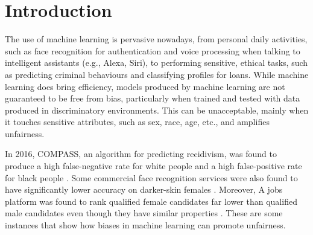 \documentclass[sigconf]{acmart}
\begin{document}
	
	
	\maketitle
	
	\section{Introduction}
	\label{sec:introduction}
	The use of machine learning is pervasive nowadays, from personal daily activities, such as face recognition for authentication and voice processing when talking to intelligent assistants (e.g., Alexa, Siri), to performing sensitive, ethical tasks, such as predicting criminal behaviours and classifying profiles for loans. While machine learning does bring efficiency, models produced by machine learning are not guaranteed to be free from bias, particularly when trained and tested with data produced in discriminatory environments. This can be unacceptable, mainly when it touches sensitive attributes, such as sex, race, age, etc., and amplifies unfairness. 
	
	In 2016, COMPASS, an algorithm for predicting recidivism, was found to produce a high false-negative rate for white people and a high false-positive rate for black people \cite{angwin2016machine}. Some commercial face recognition services were also found to have significantly lower accuracy on darker-skin females \cite{buolamwini2018gender}. Moreover, A jobs platform was found to rank qualified female candidates far lower than qualified male candidates even though they have similar properties \cite{lahoti2019ifair}. These are some instances that show how biases in machine learning can promote unfairness. 
	
\end{document}
